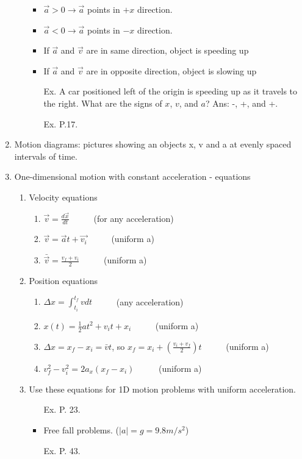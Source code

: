 \documentclass[12pt,epsf]{article}
\begin{document}
\begin{enumerate}
\begin{enumerate}
    \begin{itemize}
    \item $\vec{a} > 0 \longrightarrow \vec{a}$ points in $+x$ direction.
    \item $\vec{a} < 0 \longrightarrow \vec{a}$ points in $-x$ direction.
    \item If $\vec{a}$ and $\vec{v}$ are in same direction, object is speeding up
    \item If $\vec{a}$ and $\vec{v}$ are in opposite direction, object is slowing up
    \item [Ex.] A car positioned left of the origin is speeding up as it 
	travels to the right.  What are the signs of $x$, $v$, and $a$? Ans:
        -, +, and +.
    \item [Ex.] P.17.
    \end{itemize}
  \end{enumerate}
\item Motion diagrams: pictures showing an objects x, v and a at evenly spaced
intervals of time.
\item One-dimensional motion with constant acceleration - equations
  \begin{enumerate}
  \item Velocity equations
	\begin{enumerate}
	\item $\vec{v}=\frac{d\vec{x}}{d t}$ ~~~~~(for any acceleration)
        \item $\vec{v}=\vec{a}t + \vec{v_i}$ ~~~~~(uniform a)
        \item $\bar{\vec{v}}=\frac{v_f + v_i}{2}$ ~~~~~(uniform a)
	\end{enumerate}
  \item Position equations
	\begin{enumerate}
	\item $\Delta x=\int_{t_i}^{t_f}v dt$  ~~~~~(any acceleration)
        \item $x(t) = \frac{1}{2}at^2 + v_i t + x_i$  ~~~~~(uniform a)
	\item $\Delta x = x_f - x_i = \bar{v}t$, so $x_f=x_i+(\frac{v_i+v_f}{2})t$ ~~~~~(uniform a)
	\item $v_f^2 - v_i^2 = 2 a_x (x_f - x_i)$ ~~~~~(uniform a)
	\end{enumerate}
  \item Use these equations for 1D motion problems with uniform acceleration.
	\begin{itemize}
	\item [Ex.] P. 23.
	\item Free fall problems. ($\left|a\right| = g = 9.8 m/s^2$)
	\item [Ex.] P. 43.
	\end{itemize}
  \end{enumerate}
\end{enumerate}
\end{document}
